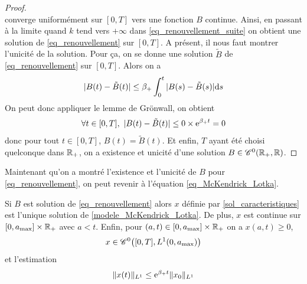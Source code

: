 \begin{proof}
\begin{equation*}
    \end{equation*}
    converge uniformément sur $[0,T]$ vers une fonction $B$ continue. Ainsi, en passant à la limite quand $k$ tend vers $+\infty$ dans \eqref{eq_renouvellement_suite} on obtient une solution de \eqref{eq_renouvellement} sur $[0,T]$. A présent, il nous faut montrer l'unicité de la solution. Pour ça, on se donne une solution $\tilde{B}$ de \eqref{eq_renouvellement} sur $[0,T]$. Alors on a 
    \begin{equation*}
        |B(t)-\tilde{B}(t)| \leq \beta_+\int_0^t |B(s)-\tilde{B}(s)| \mathrm{d} s
    \end{equation*}
    On peut donc appliquer le lemme de Grönwall, on obtient
    \begin{equation*}
        \forall t \in [0,T], \ |B(t)-\tilde{B}(t)| \leq 0 \times \mathrm{e}^{\beta_+t} = 0
    \end{equation*}
    donc pour tout $t \in [0,T]$, $B(t) = \tilde{B}(t)$. Et enfin, $T$ ayant été choisi quelconque dans $\mathbb{R}_+$, on a existence et unicité d'une solution $B \in \mathscr{C}^0(\mathbb{R}_+,\mathbb{R})$.
\end{proof}

Maintenant qu'on a montré l'existence et l'unicité de $B$ pour \eqref{eq_renouvellement}, on peut revenir à l'équation \eqref{eq_McKendrick_Lotka}.

\begin{theorem}
    Si $B$ est solution de \eqref{eq_renouvellement} alors $x$ définie par \eqref{sol_caracteristiques} est l'unique solution de \eqref{modele_McKendrick_Lotka}. De plus, $x$ est continue sur $[0,a_{\max}] \times \mathbb{R}_+$ avec $a<t$. Enfin, pour $(a,t) \in [0,a_{\max}] \times \mathbb{R}_+$ on a $x(a,t) \geq 0$,
    \begin{equation*}
        x \in \mathscr{C}^0\big([0,T], L^1(0,a_{\max})\big)
    \end{equation*}
    et l'estimation
    \begin{equation*}
        \|x(t)\|_{L^1} \leq \mathrm{e}^{\beta_+t}\|x_0\|_{L^1}
    \end{equation*}
\end{theorem}

